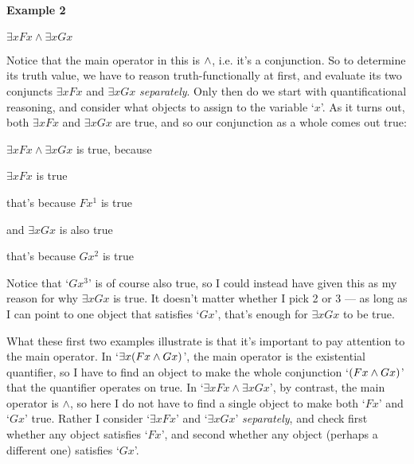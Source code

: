 \paragraph{Example 2} $\exists x Fx \land \exists x Gx$

\noindent Notice that the main operator in this is $\wedge$, i.e. it's a conjunction.  So to determine its truth value, we have to reason truth-functionally at first, and evaluate its two conjuncts $\exists xFx$ and $\exists xGx$ \emph{separately}.  Only then do we start with quantificational reasoning, and consider what objects to assign to the variable `$x$'.    As it turns out, both $\exists xFx$ and $\exists xGx$ are true, and so our conjunction as a whole comes out true:
\begin{etriangle}
\item $\exists x Fx \land \exists x Gx$ is true, because
\begin{etriangle}
\item $\exists xFx$ is true
\begin{etriangle}
\item that's because $Fx^1$ is true
\end{etriangle}
\item and $\exists xGx$ is also true
 \begin{etriangle}
 \item that's because $Gx^2$ is true
\end{etriangle}
\end{etriangle}
\end{etriangle}
Notice that `$Gx^3$' is of course also true, so I could instead have given this as my reason for why $\exists xGx$  is true.   It doesn't matter whether I pick 2 or 3 --- as long as I can point to one object that satisfies `$Gx$', that's enough for $\exists xGx$ to be true.

What these first two examples illustrate is that it's important to pay attention to the main operator.  In `$\exists x(Fx \wedge Gx)$', the main operator is the existential quantifier,
so I have to find an object to make the whole conjunction `$(Fx \wedge Gx)$' that the quantifier operates on true.  In `$\exists x Fx \land \exists x Gx$', by contrast, the main operator is $\land$, so here I do not have to find a single object to make both `$Fx$' and `$Gx$' true.  Rather I consider `$\exists x Fx$' and `$\exists x Gx$' \emph{separately}, and  check first whether any object satisfies `$Fx$', and second whether any object (perhaps a different one) satisfies `$Gx$'.

